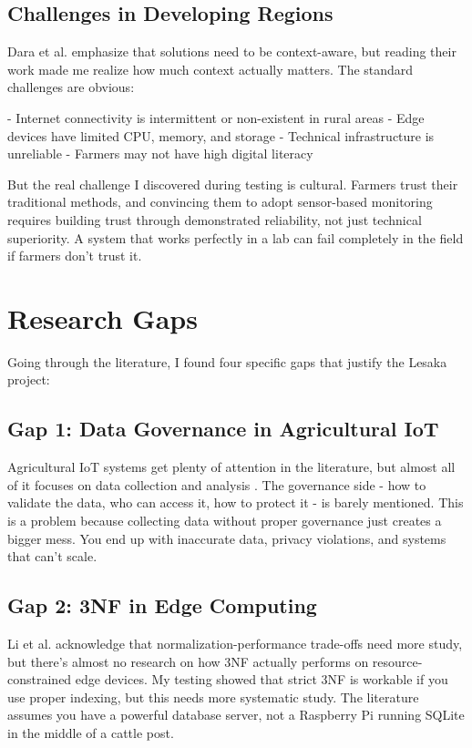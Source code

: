 \subsection{Challenges in Developing Regions}

Dara et al. \cite{dara2018precision} emphasize that solutions need to be context-aware, but reading their work made me realize how much context actually matters. The standard challenges are obvious:

- Internet connectivity is intermittent or non-existent in rural areas
- Edge devices have limited CPU, memory, and storage
- Technical infrastructure is unreliable
- Farmers may not have high digital literacy

But the real challenge I discovered during testing is cultural. Farmers trust their traditional methods, and convincing them to adopt sensor-based monitoring requires building trust through demonstrated reliability, not just technical superiority. A system that works perfectly in a lab can fail completely in the field if farmers don't trust it.

\section{Research Gaps}

Going through the literature, I found four specific gaps that justify the Lesaka project:

\subsection{Gap 1: Data Governance in Agricultural IoT}

Agricultural IoT systems get plenty of attention in the literature, but almost all of it focuses on data collection and analysis \cite{bag2019smart}. The governance side - how to validate the data, who can access it, how to protect it - is barely mentioned. This is a problem because collecting data without proper governance just creates a bigger mess. You end up with inaccurate data, privacy violations, and systems that can't scale.

\subsection{Gap 2: 3NF in Edge Computing}

Li et al. \cite{li2018database} acknowledge that normalization-performance trade-offs need more study, but there's almost no research on how 3NF actually performs on resource-constrained edge devices. My testing showed that strict 3NF is workable if you use proper indexing, but this needs more systematic study. The literature assumes you have a powerful database server, not a Raspberry Pi running SQLite in the middle of a cattle post.

